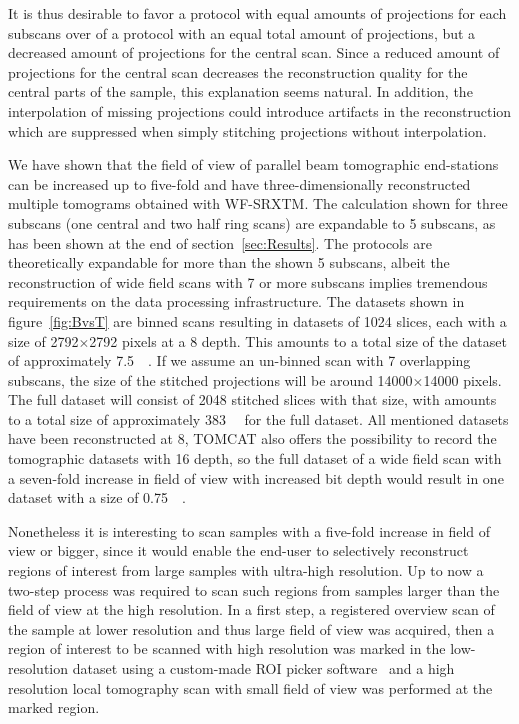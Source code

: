 It is thus desirable to favor a protocol with equal amounts of projections for each subscans over of a protocol with an equal total amount of projections, but a decreased amount of projections for the central scan. Since a reduced amount of projections for the central scan decreases the reconstruction quality for the central parts of the sample, this explanation seems natural. In addition, the interpolation of missing projections could introduce artifacts in the reconstruction which are suppressed when simply stitching projections without interpolation.

We have shown that the field of view of parallel beam tomographic end-stations can be increased up to five-fold and have three-dimensionally reconstructed multiple tomograms obtained with WF-SRXTM. The calculation shown for three subscans (one central and two half ring scans) are expandable to 5 subscans, as has been shown at the end of section~\ref{sec:Results}. The protocols are theoretically expandable for more than the shown 5 subscans, albeit the reconstruction of wide field scans with 7 or more subscans implies tremendous requirements on the data processing infrastructure. The datasets shown in figure~\ref{fig:BvsT} are binned scans resulting in datasets of 1024 slices, each with a size of 2792$\times$2792 pixels at a \SI{8}{\bit} depth. This amounts to a total size of the dataset of approximately \SI{7.5}{\giga\byte}. If we assume an un-binned scan with 7 overlapping subscans, the size of the stitched projections will be around 14000$\times$14000 pixels. The full dataset will consist of 2048 stitched slices with that size, with amounts to a total size of approximately \SI{383}{\giga\byte} for the full dataset. All mentioned datasets have been reconstructed at \SI{8}{\bit}, TOMCAT also offers the possibility to record the tomographic datasets with \SI{16}{\bit} depth, so the full dataset of a wide field scan with a seven-fold increase in field of view with increased bit depth would result in one dataset with a size of \SI{0.75}{\tera\byte}.

Nonetheless it is interesting to scan samples with a five-fold increase in field of view or bigger, since it would enable the end-user to selectively reconstruct regions of interest from large samples with ultra-high resolution. Up to now a two-step process was required to scan such regions from samples larger than the field of view at the high resolution. In a first step, a registered overview scan of the sample at lower resolution and thus large field of view was acquired, then a region of interest to be scanned with high resolution was marked in the low-resolution dataset using a custom-made ROI picker software~\cite{Heinzer2008} and a high resolution local tomography scan with small field of view was performed at the marked region.

